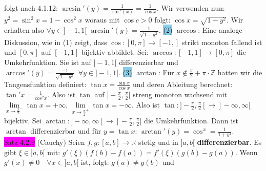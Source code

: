 \documentclass[landscape, 10pt]{article}
\newcommand{\R}{\mathbb{R}}
\begin{document}
\begin{multicols}{3}
                     folgt nach 4.1.12:
                     $\arcsin'(y)=\frac{1}{\sin'(x)}=\frac{1}{\cos x}$.
                     Wir verwenden nun: $y^2=\sin^2x=1-\cos^2x$
                     woraus mit $\cos c>0$ folgt:
                     $\cos x=\sqrt{1-y^2}$. Wir erhalten also 
                     $\forall y\in ]-1,1[$
                     $\arcsin'(y)=\frac{1}{\sqrt{1-y^2}}$.
                     \colorbox{SkyBlue}{(2)} $\arccos$:
                     Eine analoge Diskussion, wie in (1) zeigt, dass
                     $\cos:[0,\pi]\longrightarrow[-1,]$ strikt monoton fallend ist
                     und $[0,\pi]$ auf $[-1,1]$ bijektiv abbildet. Sei:
                     $\arccos:[-1,1]\longrightarrow[0,\pi]$ die 
                     Umkehrfunktion. Sie ist auf $]-1,1[$ 
                     differenzierbar und
                     $\arccos'(y)=\frac{-1}{\sqrt{1-y^2}}\enspace\forall y\in]-1,1[$.
                     \colorbox{SkyBlue}{(3)} $\arctan$:
                     Für $x\notin\frac{\pi}{2}+\pi\cdot\mathbb{Z}$
                     hatten wir die Tangensfunktion definiert:
                     $\tan x=\frac{\sin x}{\cos x}$ und deren Ableitung 
                     berechnet:
                     $\tan'x=\frac{1}{cos^2x}$. Also ist $\tan$ auf
                     $]-\frac{\pi}{2},\frac{\pi}{2}[$ streng monoton wachsend mit
                     $\lim\limits_{x\to\frac{\pi}{2}^{-}}\tan x=+\infty$,
                     $\lim\limits_{x\to\frac{\pi}{2}^{+}}\tan x=-\infty$.
                     Also ist 
                     $\tan:]-\frac{\pi}{2},\frac{\pi}{2}[
                     \longrightarrow]-\infty,\infty[$ bijektiv. Sei
                     $\arctan:]-\infty,\infty[\longrightarrow
                     ]-\frac{\pi}{2},\frac{\pi}{2}[$ die 
                     Umkehrfunktion.
                     Dann ist $\arctan$ differenzierbar und für 
                     $y=\tan x$: $\arctan'(y)=\cos^x=\frac{1}{1+y^2}$.\\
              \colorbox{magenta}{Satz 4.2.9} 
              (Cauchy)
                     Seien 
                     \textcolor{NavyBlue}{$f,g:[a,b]\longrightarrow\R$}
                     stetig und in \textcolor{NavyBlue}{$]a,b[$} 
                     \textbf{differenzierbar}.
                     Es gibt \textcolor{NavyBlue}{$\xi\in]a,b[$} mit: 
                     \textcolor{NavyBlue}{$g'(\xi)(f(b)-f(a))=f'(\xi)(g(b)-g(a))$}. 
                     Wenn \textcolor{NavyBlue}{$g'(x)\neq0\quad\forall x\in]a,b[$} 
                     ist, folgt: \textcolor{NavyBlue}{$g(a)\neq g(b)$} und 

\end{multicols}
\end{document}

